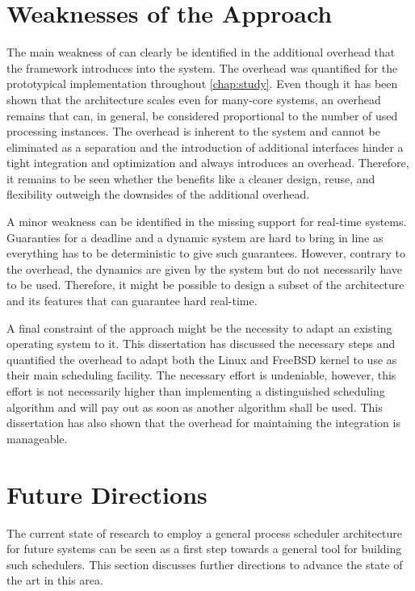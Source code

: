 \section{Weaknesses of the Approach}%
\label{sec:concl:weaknesses}

The main weakness of \cobas{} can clearly be identified in the additional overhead that the framework introduces into the system. The overhead was quantified for the prototypical implementation throughout \cref{chap:study}. Even though it has been shown that the \cobas{} architecture scales even for many-core systems, an overhead remains that can, in general, be considered proportional to the number of used processing instances. The overhead is inherent to the system and cannot be eliminated as a separation and the introduction of additional interfaces hinder a tight integration and optimization and always introduces an overhead. Therefore, it remains to be seen whether the benefits like a cleaner design, reuse, and flexibility outweigh the downsides of the additional overhead.

A minor weakness can be identified in the missing support for real-time systems. Guaranties for a deadline and a dynamic system are hard to bring in line as everything has to be deterministic to give such guarantees. However, contrary to the overhead, the dynamics are given by the system but do not necessarily have to be used. Therefore, it might be possible to design a subset of the \cobas{} architecture and its features that can guarantee hard real-time.

A final constraint of the \cobas{} approach might be the necessity to adapt an existing operating system to it. This dissertation has discussed the necessary steps and quantified the overhead to adapt both the Linux and FreeBSD kernel to use \cobas{} as their main scheduling facility. The necessary effort is undeniable, however, this effort is not necessarily higher than implementing a distinguished scheduling algorithm and will pay out as soon as another algorithm shall be used. This dissertation has also shown that the overhead for maintaining the \cobas{} integration is manageable.

\section{Future Directions}%
\label{sec:concl:future_work}

The current state of research to employ a general process scheduler architecture for future systems can be seen as a first step towards a general tool for building such schedulers. This section discusses further directions to advance the state of the art in this area.

